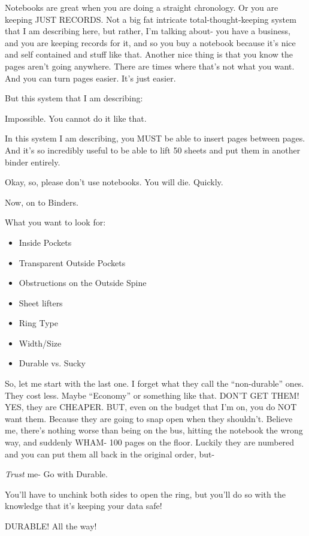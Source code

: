 \documentclass[oneside]{book}
\begin{document}
Notebooks are great when you are doing a straight chronology. Or you
are keeping JUST RECORDS. Not a big fat intricate
total-thought-keeping system that I am describing here, but rather,
I'm talking about- you have a business, and you are keeping records
for it, and so you buy a notebook because it's nice and self contained
and stuff like that. Another nice thing is that you know the pages
aren't going anywhere. There are times where that's not what you
want. And you can turn pages easier. It's just easier.

But this system that I am describing:

Impossible. You cannot do it like that.

In this system I am describing, you MUST be able to insert pages
between pages. And it's so incredibly useful to be able to lift 50
sheets and put them in another binder entirely.

Okay, so, please don't use notebooks. You will die. Quickly.


Now, on to Binders.

What you want to look for:

\begin{itemize}
\item Inside Pockets
\item Transparent Outside Pockets
\item Obstructions on the Outside Spine
\item Sheet lifters
\item Ring Type
\item Width/Size
\item Durable vs. Sucky
\end{itemize}

So, let me start with the last one. I forget what they call the
``non-durable'' ones. They cost less. Maybe ``Economy'' or something like
that. DON'T GET THEM! YES, they are CHEAPER. BUT, even on the budget
that I'm on, you do NOT want them. Because they are going to snap open
when they shouldn't. Believe me, there's nothing worse than being on
the bus, hitting the notebook the wrong way, and suddenly WHAM- 100
pages on the floor. Luckily they are numbered and you can put them all
back in the original order, but-

\emph{Trust} me- Go with Durable.

You'll have to unchink both sides to open the ring, but you'll do so
with the knowledge that it's keeping your data safe!

DURABLE! All the way!
\end{document}

